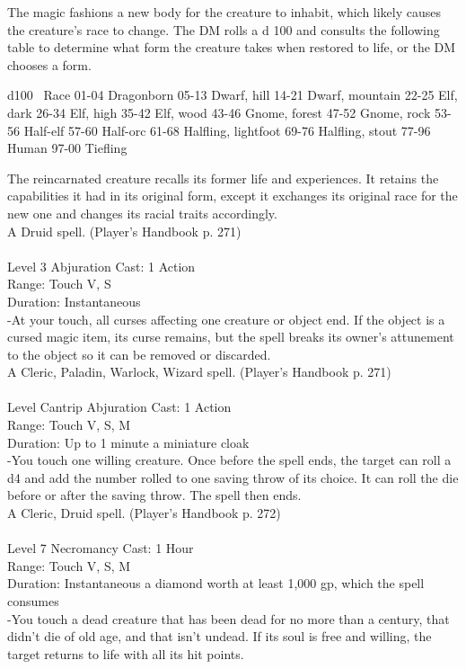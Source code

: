 \documentclass[10pt,twocolumn]{report}
\begin{document}
The magic fashions a new body for the creature to inhabit, which likely causes the creature’s race to change. The DM rolls a d 100 and consults the following table to determine what form the creature takes when restored to life, or the DM chooses a form.

d100  Race
01-04 Dragonborn
05-13 Dwarf, hill
14-21 Dwarf, mountain
22-25 Elf, dark
26-34 Elf, high
35-42 Elf, wood
43-46 Gnome, forest
47-52 Gnome, rock
53-56  Half-elf
57-60 Half-orc
61-68 Halfling, lightfoot
69-76 Halfling, stout
77-96 Human
97-00 Tiefling

The reincarnated creature recalls its former life and experiences. It retains the capabilities it had in its original form, except it exchanges its original race for the new one and changes its racial traits accordingly.\\
A Druid spell. (Player's Handbook p. 271) \\


 \\
Level 3 \quad Abjuration \quad Cast: 1 Action\\
Range: Touch \quad V, S\\
Duration: Instantaneous \quad \\
-At your touch, all curses affecting one creature or object end. If the object is a cursed magic item, its curse remains, but the spell breaks its owner’s attunement to the object so it can be removed or discarded.\\
A Cleric, Paladin, Warlock, Wizard spell. (Player's Handbook p. 271) \\


 \\
Level Cantrip \quad Abjuration \quad Cast: 1 Action\\
Range: Touch \quad V, S, M\\
Duration: Up to 1 minute \quad a miniature cloak\\
-You touch one willing creature. Once before the spell ends, the target can roll a d4 and add the number rolled to one saving throw of its choice. It can roll the die before or after the saving throw. The spell then ends.\\
A Cleric, Druid spell. (Player's Handbook p. 272) \\


 \\
Level 7 \quad Necromancy \quad Cast: 1 Hour\\
Range: Touch \quad V, S, M\\
Duration: Instantaneous \quad a diamond worth at least 1,000 gp, which the spell consumes\\
-You touch a dead creature that has been dead for no more than a century, that didn’t die of old age, and that isn’t undead. If its soul is free and willing, the target returns to life with all its hit points.
\end{document}
